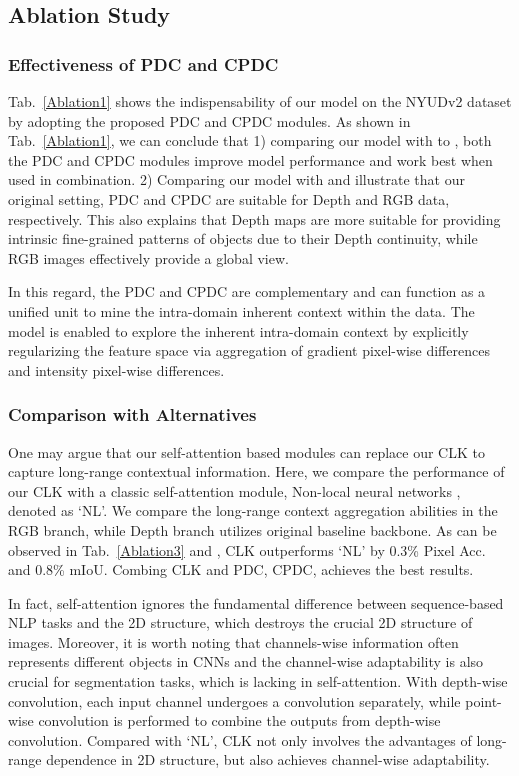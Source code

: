 \documentclass[lettersize,journal]{IEEEtran}
\begin{document}
\subsection{Ablation Study}
\label{Ablation Study}
\subsubsection{Effectiveness of PDC and CPDC}
Tab.~\ref{Ablation1} shows the indispensability of our model on the NYUDv2 dataset by adopting the proposed PDC and CPDC modules. As shown in Tab.~\ref{Ablation1}, we can conclude that 1) comparing our model with  to , both the PDC and CPDC modules improve model performance and work best when used in combination. 2) Comparing our model with  and  illustrate that our original setting,  PDC and CPDC are suitable for Depth and RGB data, respectively. This also explains that Depth maps are more suitable for providing intrinsic fine-grained patterns of objects due to their Depth continuity, while RGB images effectively provide a global view.

In this regard, the PDC and CPDC are complementary and can function as a unified unit to mine the intra-domain inherent context within the data. The model is enabled to explore the inherent intra-domain context by explicitly regularizing the feature space via aggregation of gradient pixel-wise differences and intensity pixel-wise differences.




\subsubsection{Comparison with Alternatives} 
One may argue that our self-attention based modules can replace our CLK to capture long-range contextual information. Here, we compare the performance of our CLK with a classic self-attention module, Non-local neural networks \cite{wang2018non}, denoted as `NL'. We compare the long-range context aggregation abilities in the RGB branch, while Depth branch utilizes original baseline backbone. As can be observed in Tab.~\ref{Ablation3}  and , CLK outperforms `NL' by 0.3\% Pixel Acc. and 0.8\% mIoU. Combing CLK and PDC,  CPDC, achieves the best results.

In fact, self-attention ignores the fundamental difference between sequence-based NLP tasks and the 2D structure, which destroys the crucial 2D structure of images. Moreover, it is worth noting that channels-wise information often represents different objects in CNNs \cite{qin2020ffa,chen2017sca, ma2022learning} and the channel-wise adaptability is also crucial for segmentation tasks, which is lacking in self-attention. With depth-wise convolution, each input channel undergoes a convolution separately, while point-wise convolution is performed to combine the outputs from depth-wise convolution.
Compared with `NL', CLK not only involves the advantages of long-range dependence in 2D structure, but also achieves channel-wise adaptability.
\end{document}
